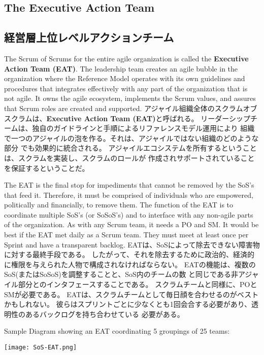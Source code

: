 \documentclass[12pt,a4paper,parskip=full]{scrartcl}
\begin{document}
\subsection{The Executive Action Team}
\fi
\subsection{経営層上位レベルアクションチーム}
The Scrum of Scrums for the entire agile organization is called the
\textbf{Executive Action Team (EAT)}. The leadership team creates an agile bubble
in the organization where the Reference Model operates with 
its own guidelines and procedures that integrates effectively 
with any part of the organization that is not agile. It owns the agile ecosystem, 
implements the Scrum values, and assures that 
Scrum roles are created and supported.
\fi
アジャイル組織全体のスクラムオブスクラムは、\textbf{Executive Action Team (EAT)}と呼ばれる。
リーダーシップチームは、独自のガイドラインと手順によるリファレンスモデル運用により
組織で一つのアジャイルの泡を作る。それは、アジャイルではない組織のどのような部分
でも効果的に統合される。
アジャイルエコシステムを所有するということは、スクラムを実装し、スクラムのロールが
作成されサポートされていることを保証するということだ。

The EAT is the final stop for
impediments that cannot be removed by the SoS's that feed it. Therefore, it
must be comprised of individuals who are empowered, politically and
financially, to remove them. 
The function of the EAT is to coordinate
multiple SoS's (or SoSoS's) and to interface with any non-agile parts 
of the organization. As with any Scrum team, it needs a PO and SM.
It would be best if the EAT met daily as a Scrum team. They must meet at
least once per Sprint and have a transparent backlog.
\fi
EATは、SoSによって除去できない障害物に対する最終手段である。
したがって、それを除去するために政治的、経済的に権限を与えられた人物で構成されなければならない。
EATの機能は、複数のSoS(またはSoSoS)を調整することと、SoS内のチームの数
と同じである非アジャイル部分とのインタフェースすることである。
スクラムチームと同様に、POとSMが必要である。
EATは、スクラムチームとして毎日顔を合わせるのがベストかもしれない。
彼らはスプリントごとに少なくとも1回会合する必要があり、透明性のあるバックログを持ち合わせている
必要がある。

Sample Diagram showing an EAT coordinating 5 groupings of 25 teams:

\texttt{[image: SoS-EAT.png]}
\end{document}

